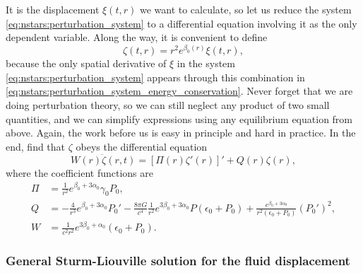 It is the displacement $\xi(t,r)$ we want to calculate, so let us reduce the system \eqref{eq:nstars:perturbation_system} to a differential equation involving it as the only dependent variable.
Along the way, it is convenient to define
\begin{equation}
	\zeta(t,r) = r^2 e^{\beta_0(r)} \xi(t,r),
\label{eq:nstars:definition_zeta}
\end{equation}
because the only spatial derivative of $\xi$ in the system \eqref{eq:nstars:perturbation_system} appears through this combination in \cref{eq:nstars:perturbation_system_energy_conservation}.
Never forget that we are doing perturbation theory, so we can still neglect any product of two small quantities, and we can simplify expressions using any equilibrium equation from above.
Again, the work before us is easy in principle and hard in practice.
In the end, \cite[equation 26.19]{ref:mtw} find that $\zeta$ obeys the differential equation
\begin{equation}
	W(r) \ddot{\zeta}(r,t) = \left[ \Pi(r) \zeta'(r) \right]' + Q(r) \zeta(r) ,
\label{eq:nstars:diffeq_zeta}
\end{equation}
where the coefficient functions are
\begin{subequations}
\begin{align}
	\Pi &= \frac{1}{r^2} e^{\beta_0 + 3 \alpha_0} \gamma_0 P_0 , \label{eq:nstars:sturm_liouville_coefficients_Pi} \\
	Q   &= -\frac{4}{r^3} e^{\beta_0 + 3 \alpha_0} P_0' - \frac{8 \pi G}{c^4} \frac{1}{r^2} e^{3 \beta_0 + 3 \alpha_0} P (\epsilon_0 + P_0) + \frac{e^{\beta_0 + 3 \alpha_0}}{r^2(\epsilon_0 + P_0)} \left( P_0' \right)^2 , \label{eq:nstars:sturm_liouville_coefficients_Q} \\
	W   &= \frac{1}{c^2 r^2} e^{3 \beta_0 + \alpha_0} (\epsilon_0 + P_0) . \label{eq:nstars:sturm_liouville_coefficients_W}
\end{align}
\label{eq:nstars:sturm_liouville_coefficients}
\end{subequations}

\subsubsection{General Sturm-Liouville solution for the fluid displacement}

